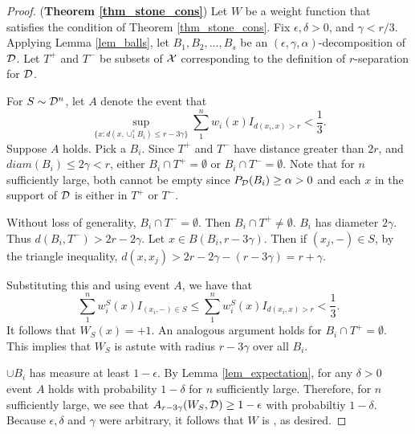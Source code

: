 \begin{proof} (\textbf{Theorem \ref{thm_stone_cons}})
Let $W$ be a weight function that satisfies the condition of Theorem \ref{thm_stone_cons}. Fix $\epsilon, \delta > 0$, and $\gamma < r/3$. Applying Lemma \ref{lem_balls}, let $B_1, B_2, \dots, B_s$ be an $(\epsilon, \gamma, \alpha)$-decomposition of ${\mathcal D}$. Let $T^+$ and $T^-$ be subsets of $\mathcal X$ corresponding to the definition of $r$-separation for ${\mathcal D}$.  

For $S \sim {\mathcal D}^n$, let $A$ denote the event that $$\sup_{\{x: d(x, \cup_1^s B_i) \leq r - 3\gamma\}} \sum_1^n w_i(x)I_{d(x_i, x) > r} < \frac{1}{3}.$$
Suppose $A$ holds. Pick a $B_i$. Since $T^+$ and $T^-$ have distance greater than $2r$, and $diam(B_i) \leq 2\gamma < r$, either $B_i \cap T^+ = \emptyset$ or $B_i \cap T^- = \emptyset$. Note that for $n$ sufficiently large, both cannot be empty since $P_{\mathcal D}(B_i) \geq \alpha > 0$ and each $x$ in the support of ${\mathcal D}$ is either in $T^+$ or $T^-$. 

Without loss of generality, $B_i \cap T^- = \emptyset$. Then $B_i \cap T^+ \neq \emptyset$. $B_i$ has diameter $2\gamma$. Thus $d(B_i, T^-) > 2r - 2\gamma$. Let $x \in B(B_i, r-3\gamma)$. Then if $(x_j, -) \in S$, by the triangle inequality, $d(x, x_j) > 2r -2\gamma - (r - 3\gamma) = r+\gamma$. 

Substituting this and using event $A$, we have that $$\sum_1^n w_i^S(x)I_{(x_i, -) \in S} \leq \sum_1^n w_i^S(x)I_{d(x_i, x) > r} < \frac{1}{3}.$$ It follows that $W_S(x) = +1$. An analogous argument holds for $B_i \cap T^+ = \emptyset$. This implies that $W_S$ is astute with radius $r-3\gamma$ over all $B_i$.

$\cup B_i$ has measure at least $1-\epsilon$. By Lemma \ref{lem_expectation}, for any $\delta>0$ event $A$ holds with probability $1-\delta$ for $n$ sufficiently large. Therefore, for $n$ sufficiently large, we see that $A_{r-3\gamma}(W_S, {\mathcal D}) \geq 1-\epsilon$ with probabiltiy $1-\delta$. Because $\epsilon, \delta$ and $\gamma$ were arbitrary, it follows that $W$ is \rcons,\emph{ }as desired.

\end{proof}

